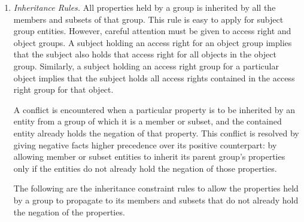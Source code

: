 \documentclass[11pt]{report}
\newenvironment{vquote}
{
  \begin{list}{}{\leftmargin 1em}\item[]
}
{
  \end{list}
}
\begin{document}
            \begin{enumerate}
              \item
                {\em Inheritance Rules.}
                All properties held by a group is inherited by all the members
                and subsets of that group. This rule is easy to apply for
                subject group entities. However, careful attention must be
                given to access right and object groups. A subject holding an
                access right for an object group implies that the subject also
                holds that access right for all objects in the object group.
                Similarly, a subject holding an access right group for a
                particular object implies that the subject holds all access
                rights contained in the access right group for that object.

                A conflict is encountered when a particular property is to be
                inherited by an entity from a group of which it is a member or
                subset, and the contained entity already holds the negation of
                that property. This conflict is resolved by giving negative
                facts higher precedence over its positive counterpart: by
                allowing member or subset entities to inherit its parent
                group's properties only if the entities do not already hold
                the negation of those properties.

                The following are the inheritance constraint rules to allow the
                properties held by a group to propagate to its members and
                subsets that do not already hold the negation of the
                properties.

\end{enumerate}
\end{document}
